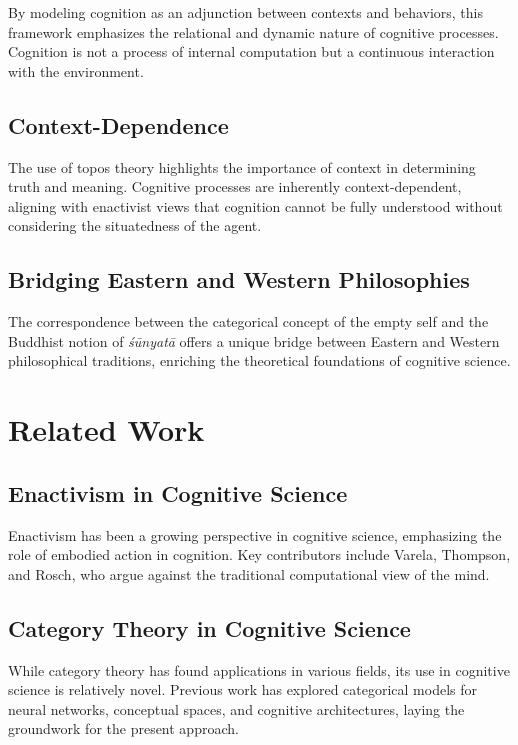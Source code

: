 \documentclass{article}
\begin{document}
By modeling cognition as an adjunction between contexts and behaviors, this framework emphasizes the relational and dynamic nature of cognitive processes. Cognition is not a process of internal computation but a continuous interaction with the environment.

\subsection{Context-Dependence}

The use of topos theory highlights the importance of context in determining truth and meaning. Cognitive processes are inherently context-dependent, aligning with enactivist views that cognition cannot be fully understood without considering the situatedness of the agent.

\subsection{Bridging Eastern and Western Philosophies}

The correspondence between the categorical concept of the empty self and the Buddhist notion of \emph{śūnyatā} offers a unique bridge between Eastern and Western philosophical traditions, enriching the theoretical foundations of cognitive science.

\section{Related Work}

\subsection{Enactivism in Cognitive Science}

Enactivism has been a growing perspective in cognitive science, emphasizing the role of embodied action in cognition. Key contributors include Varela, Thompson, and Rosch, who argue against the traditional computational view of the mind.

\subsection{Category Theory in Cognitive Science}

While category theory has found applications in various fields, its use in cognitive science is relatively novel. Previous work has explored categorical models for neural networks, conceptual spaces, and cognitive architectures, laying the groundwork for the present approach.
\end{document}
